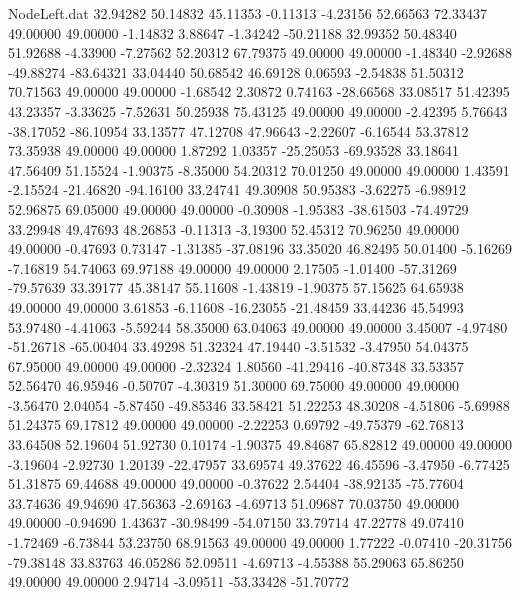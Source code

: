 \begin{filecontents}{NodeLeft.dat}
  32.94282   50.14832   45.11353    -0.11313   -4.23156   52.66563   72.33437   49.00000   49.00000   -1.14832    3.88647   -1.34242  -50.21188
  32.99352   50.48340   51.92688    -4.33900   -7.27562   52.20312   67.79375   49.00000   49.00000   -1.48340   -2.92688  -49.88274  -83.64321
  33.04440   50.68542   46.69128     0.06593   -2.54838   51.50312   70.71563   49.00000   49.00000   -1.68542    2.30872    0.74163  -28.66568
  33.08517   51.42395   43.23357    -3.33625   -7.52631   50.25938   75.43125   49.00000   49.00000   -2.42395    5.76643  -38.17052  -86.10954
  33.13577   47.12708   47.96643    -2.22607   -6.16544   53.37812   73.35938   49.00000   49.00000    1.87292    1.03357  -25.25053  -69.93528
  33.18641   47.56409   51.15524    -1.90375   -8.35000   54.20312   70.01250   49.00000   49.00000    1.43591   -2.15524  -21.46820  -94.16100
  33.24741   49.30908   50.95383    -3.62275   -6.98912   52.96875   69.05000   49.00000   49.00000   -0.30908   -1.95383  -38.61503  -74.49729
  33.29948   49.47693   48.26853    -0.11313   -3.19300   52.45312   70.96250   49.00000   49.00000   -0.47693    0.73147   -1.31385  -37.08196
  33.35020   46.82495   50.01400    -5.16269   -7.16819   54.74063   69.97188   49.00000   49.00000    2.17505   -1.01400  -57.31269  -79.57639
  33.39177   45.38147   55.11608    -1.43819   -1.90375   57.15625   64.65938   49.00000   49.00000    3.61853   -6.11608  -16.23055  -21.48459
  33.44236   45.54993   53.97480    -4.41063   -5.59244   58.35000   63.04063   49.00000   49.00000    3.45007   -4.97480  -51.26718  -65.00404
  33.49298   51.32324   47.19440    -3.51532   -3.47950   54.04375   67.95000   49.00000   49.00000   -2.32324    1.80560  -41.29416  -40.87348
  33.53357   52.56470   46.95946    -0.50707   -4.30319   51.30000   69.75000   49.00000   49.00000   -3.56470    2.04054   -5.87450  -49.85346
  33.58421   51.22253   48.30208    -4.51806   -5.69988   51.24375   69.17812   49.00000   49.00000   -2.22253    0.69792  -49.75379  -62.76813
  33.64508   52.19604   51.92730     0.10174   -1.90375   49.84687   65.82812   49.00000   49.00000   -3.19604   -2.92730    1.20139  -22.47957
  33.69574   49.37622   46.45596    -3.47950   -6.77425   51.31875   69.44688   49.00000   49.00000   -0.37622    2.54404  -38.92135  -75.77604
  33.74636   49.94690   47.56363    -2.69163   -4.69713   51.09687   70.03750   49.00000   49.00000   -0.94690    1.43637  -30.98499  -54.07150
  33.79714   47.22778   49.07410    -1.72469   -6.73844   53.23750   68.91563   49.00000   49.00000    1.77222   -0.07410  -20.31756  -79.38148
  33.83763   46.05286   52.09511    -4.69713   -4.55388   55.29063   65.86250   49.00000   49.00000    2.94714   -3.09511  -53.33428  -51.70772

\end{filecontents}
